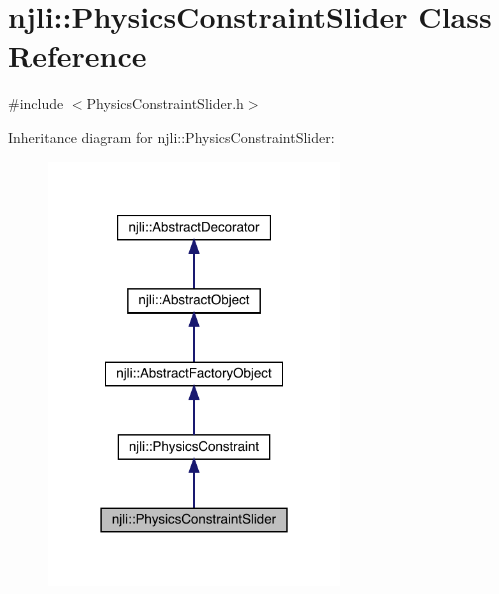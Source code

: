 \hypertarget{classnjli_1_1_physics_constraint_slider}{}\section{njli\+:\+:Physics\+Constraint\+Slider Class Reference}
\label{classnjli_1_1_physics_constraint_slider}


{\ttfamily \#include $<$Physics\+Constraint\+Slider.\+h$>$}



Inheritance diagram for njli\+:\+:Physics\+Constraint\+Slider\+:\nopagebreak
\begin{figure}[H]
\begin{center}
\leavevmode
\includegraphics[width=219pt]{classnjli_1_1_physics_constraint_slider__inherit__graph}
\end{center}
\end{figure}


